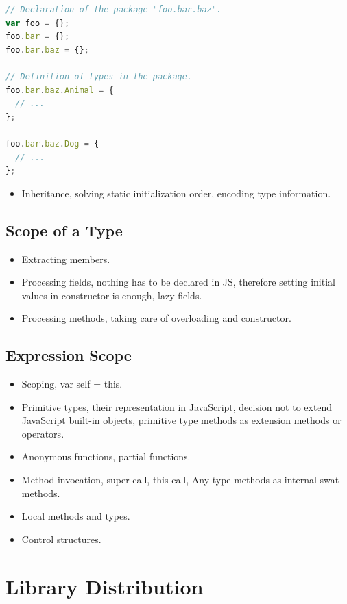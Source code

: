 \documentclass[12pt,a4paper]{report}
\begin{document}
\begin{lstlisting}[language=JavaScript,frame=single,caption={Packages in JavaScript.},label={lst:JavaScriptPackages}]
// Declaration of the package "foo.bar.baz".
var foo = {};
foo.bar = {};
foo.bar.baz = {};

// Definition of types in the package.
foo.bar.baz.Animal = {
  // ...
};

foo.bar.baz.Dog = {
  // ...
};
\end{lstlisting}

\begin{itemize}
\item Inheritance, solving static initialization order, encoding type information.
\end{itemize}

\subsection{Scope of a Type}

\begin{itemize}
\item Extracting members.
\item Processing fields, nothing has to be declared in JS, therefore setting initial values in constructor is enough, lazy fields.
\item Processing methods, taking care of overloading and constructor.
\end{itemize}

\subsection{Expression Scope}

\begin{itemize}
\item Scoping, var self = this.
\item Primitive types, their representation in JavaScript, decision not to extend JavaScript built-in objects, primitive type methods as extension methods or operators.
\item Anonymous functions, partial functions.
\item Method invocation, super call, this call, Any type methods as internal swat methods.
\item Local methods and types.
\item Control structures.
\end{itemize}

\section{Library Distribution}
\end{document}

